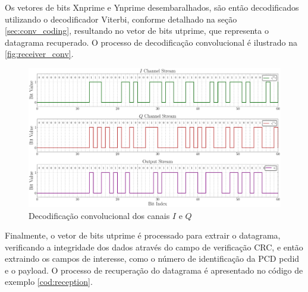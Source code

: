 Os vetores de bits \gls{Xnprime} e \gls{Ynprime} desembaralhados, são então decodificados utilizando o decodificador Viterbi, conforme detalhado na seção \ref{sec:conv_coding}, resultando no vetor de bits \gls{utprime}, que representa o datagrama recuperado. O processo de decodificação convolucional é ilustrado na \autoref{fig:receiver_conv}.

\begin{figure}[H]
	\centering
	\caption{Decodificação convolucional dos canais $I$ e $Q$}\label{fig:receiver_conv}
	\includegraphics[width=\linewidth]{assets/cap3/receiver_conv_time.pdf}
\end{figure}

Finalmente, o vetor de bits \gls{utprime} é processado para extrair o datagrama, verificando a integridade dos dados através do campo de verificação \gls{CRC}, e então extraindo os campos de interesse, como o número de identificação da PCD \gls{pcdid} e o payload. O processo de recuperação do datagrama é apresentado no código de exemplo \ref{cod:reception}.



